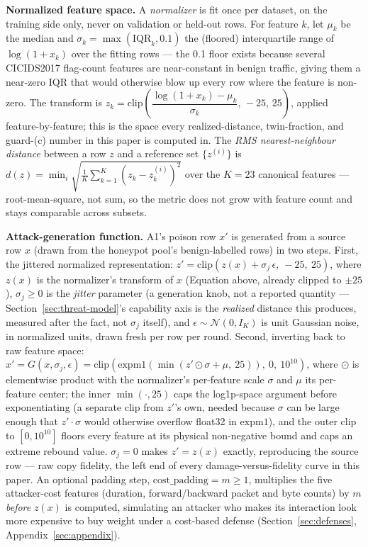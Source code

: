\textbf{Normalized feature space.} A \emph{normalizer} is fit once per dataset, on the training
side only, never on validation or held-out rows. For feature $k$, let $\mu_k$ be the median and
$\sigma_k = \max(\mathrm{IQR}_k, 0.1)$ the (floored) interquartile range of $\log(1+x_k)$ over the
fitting rows — the 0.1 floor exists because several CICIDS2017 flag-count features are
near-constant in benign traffic, giving them a near-zero IQR that would otherwise blow up every
row where the feature is non-zero. The transform is
$z_k = \mathrm{clip}\!\left(\dfrac{\log(1+x_k) - \mu_k}{\sigma_k},\, -25,\, 25\right)$,
applied feature-by-feature; this is the space every realized-distance, twin-fraction, and
guard-(c) number in this paper is computed in. The \emph{RMS nearest-neighbour distance} between
a row $z$ and a reference set $\{z^{(i)}\}$ is $d(z) = \min_i \sqrt{\tfrac{1}{K}\sum_{k=1}^K
(z_k - z^{(i)}_k)^2}$ over the $K=23$ canonical features — root-mean-square, not sum, so the
metric does not grow with feature count and stays comparable across subsets.

\textbf{Attack-generation function.} A1's poison row $x'$ is generated from a source row $x$
(drawn from the honeypot pool's benign-labelled rows) in two steps. First, the jittered
normalized representation:
$z' = \mathrm{clip}\!\left(z(x) + \sigma_j\,\epsilon,\ -25,\ 25\right)$,
where $z(x)$ is the normalizer's transform of $x$ (Equation above, already clipped to $\pm25$),
$\sigma_j \geq 0$ is the \emph{jitter} parameter (a generation knob, not a reported quantity —
Section~\ref{sec:threat-model}'s capability axis is the \emph{realized} distance this produces,
measured after the fact, not $\sigma_j$ itself), and $\epsilon \sim \mathcal{N}(0, I_K)$ is unit
Gaussian noise, in normalized units, drawn fresh per row per round. Second, inverting back to raw
feature space:
$x' = G(x, \sigma_j, \epsilon) = \mathrm{clip}\!\left(\mathrm{expm1}\!\left(\min\!\left(
z' \odot \sigma + \mu,\ 25\right)\right),\ 0,\ 10^{10}\right)$,
where $\odot$ is elementwise product with the normalizer's per-feature scale $\sigma$ and
$\mu$ its per-feature center; the inner $\min(\cdot, 25)$ caps the log1p-space argument before
exponentiating (a separate clip from $z'$'s own, needed because $\sigma$ can be large enough
that $z'\cdot\sigma$ would otherwise overflow float32 in $\mathrm{expm1}$), and the outer clip to
$[0, 10^{10}]$ floors every feature at its physical non-negative bound and caps an extreme
rebound value. $\sigma_j = 0$ makes $z'=z(x)$ exactly, reproducing the source row — raw copy
fidelity, the left end of every damage-versus-fidelity curve in this paper. An optional padding
step, $\mathrm{cost\_padding} = m \geq 1$, multiplies the five attacker-cost features (duration,
forward/backward packet and byte counts) by $m$ \emph{before} $z(x)$ is computed, simulating an
attacker who makes its interaction look more expensive to buy weight under a cost-based defense
(Section~\ref{sec:defenses}, Appendix~\ref{sec:appendix}).

